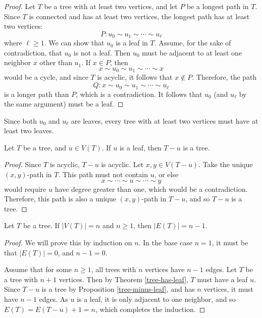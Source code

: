 \begin{proof}
    Let $T$ be a tree with at least two vertices, and let $P$ be a longest path in $T$. Since $T$ is connected and has at least two vertices, the longest path has at least two vertices:
    \[P: u_0 \sim u_1 \sim \cdots \sim u_{\ell}\] where $\ell \geq 1$. We can show that $u_0$ is a leaf in $T$. Assume, for the sake of contradiction, that $u_0$ is not a leaf. Then $u_0$ must be adjacent to at least one neighbor $x$ other than $u_1$. If $x \in P$, then
    \[x \sim u_0 \sim u_1 \sim \cdots \sim x\] would be a cycle, and since $T$ is acyclic, it follows that $x \notin P$. Therefore, the path
    \[Q: x \sim u_0 \sim u_1 \sim \cdots \sim u_{\ell}\] is a longer path than $P$, which is a contradiction. It follows that $u_0$ (and $u_{\ell}$ by the same argument) must be a leaf.
\end{proof}

\begin{rmk}
    Since both $u_0$ and $u_{\ell}$ are leaves, every tree with at least two vertices must have at least two leaves.
\end{rmk}

\begin{prop}\label{tree-minus-leaf}
    Let $T$ be a tree, and $u \in V(T)$. If $u$ is a leaf, then $T - u$ is a tree.
\end{prop}

\begin{proof}
    Since $T$ is acyclic, $T - u$ is acyclic. Let $x, y \in V(T - u)$. Take the unique $(x, y)$-path in $T$. This path must not contain $u$, or else
    \[x \sim \cdots \sim u \sim \cdots \sim y\] would require $u$ have degree greater than one, which would be a contradiction. Therefore, this path is also a unique $(x, y)$-path in $T - u$, and so $T - u$ is a tree.
\end{proof}

\begin{prop}\label{tree-edges-n-minus-one}
    Let $T$ be a tree. If $|V(T)| = n$ and $n \geq 1$, then $|E(T)| = n-1$.
\end{prop}

\begin{proof}
    We will prove this by induction on $n$. In the base case $n=1$, it must be that $|E(T)| = 0$, and $n-1 = 0$.

    Assume that for some $n \geq 1$, all trees with $n$ vertices have $n-1$ edges. Let $T$ be a tree with $n+1$ vertices. Then by Theorem \ref{tree-has-leaf}, $T$ must have a leaf $u$. Since $T - u$ is a tree by Proposition \ref{tree-minus-leaf}, and has $n$ vertices, it must have $n-1$ edges. As $u$ is a leaf, it is only adjacent to one neighbor, and so $E(T) = E(T - u) + 1 = n$, which completes the induction.
\end{proof}

